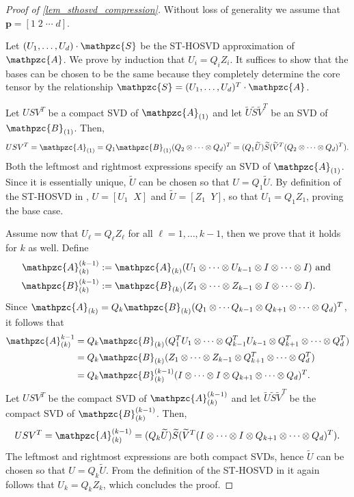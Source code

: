 \documentclass[a4paper,10pt,final]{siamart1116}
\newcommand{\tensor}[1]{\mathpzc{#1}}
\newcommand{\vect}[1]{\mathbf{#1}}
\newcommand{\reflem}[1]{\cref{#1}}
\numberwithin{equation}{section}
\numberwithin{figure}{section}
\numberwithin{table}{section}
\numberwithin{theorem}{section}
\begin{document}
\begin{proof}[Proof of \reflem{lem_sthosvd_compression}]
Without loss of generality we assume that $\vect{p} = [1\; 2\; \cdots\; d]$.

Let $(U_1,\ldots,U_d) \cdot \tensor{S}$ be the ST-HOSVD approximation of $\tensor{A}$. We prove by induction that $U_i = Q_i Z_i$. It suffices to show that the bases can be chosen to be the same because they completely determine the core tensor by the relationship $\tensor{S} = (U_1,\ldots,U_d)^T \cdot \tensor{A}$.

Let $USV^T$ be a compact SVD of $\tensor{A}_{(1)}$ and let $\widetilde{U}\widetilde{S}\widetilde{V}^T$ be an SVD of $\tensor{B}_{(1)}$. Then,
\begin{align*}
 USV^T
 = \tensor{A}_{(1)}
 = Q_1 \tensor{B}_{(1)} (Q_2 \otimes \cdots \otimes Q_d)^T
 = (Q_1 \widetilde{U}) \widetilde{S} (\widetilde{V}^T (Q_2 \otimes \cdots \otimes Q_d)^T).
\end{align*}
Both the leftmost and rightmost expressions specify an SVD of $\tensor{A}_{(1)}$. Since it is es\-sentially unique,  {$\widetilde{U}$ can be chosen} so that $U = Q_1 \widetilde{U}$. By definition of the ST-HOSVD in \cite{VVM2012}, $U = [U_1 \;\; X]$ and $\widetilde{U} = [Z_1 \;\; Y]$, so that $U_1 = Q_1 Z_1$, proving the base case.

Assume now that $U_\ell = Q_\ell Z_\ell$ for all $\ell = 1, \ldots, k-1$, then we prove that it holds for $k$ as well. Define
\begin{align*}
 \tensor{A}_{(k)}^{(k-1)} &:= \tensor{A}_{(k)} (U_1 \otimes \cdots \otimes U_{k-1} \otimes I \otimes \cdots \otimes I) \text{ and }\\
 \tensor{B}_{(k)}^{(k-1)} &:= \tensor{B}_{(k)} (Z_1 \otimes \cdots \otimes Z_{k-1} \otimes I \otimes \cdots \otimes I).
\end{align*}
Since $\tensor{A}_{(k)} = Q_k \tensor{B}_{(k)} (Q_1 \otimes \cdots Q_{k-1} \otimes Q_{k+1} \otimes \cdots \otimes Q_d )^T$, it follows that
\begin{align*}
 \tensor{A}_{(k)}^{k-1}
 &= Q_k \tensor{B}_{(k)} (Q_1^T U_1 \otimes \cdots \otimes Q_{k-1}^T U_{k-1} \otimes Q_{k+1}^T \otimes \cdots \otimes Q_d^T) \\
 &= Q_k \tensor{B}_{(k)} (Z_1 \otimes \cdots \otimes Z_{k-1} \otimes Q_{k+1}^T \otimes \cdots \otimes Q_d^T) \\
 &= Q_k \tensor{B}_{(k)}^{(k-1)} (I\otimes \cdots \otimes I\otimes Q_{k+1} \otimes \cdots \otimes Q_d)^T.
\end{align*}
Let $USV^T$ be the compact SVD of $\tensor{A}_{(k)}^{(k-1)}$ and let $\widetilde{U}\widetilde{S}\widetilde{V}^T$ be the compact SVD of $\tensor{B}_{(k)}^{(k-1)}$. Then,
\[
 USV^T = \tensor{A}_{(k)}^{(k-1)} = (Q_k \widetilde{U}) \widetilde{S} (\widetilde{V}^T (I\otimes \cdots \otimes I\otimes Q_{k+1} \otimes \cdots \otimes Q_d)^T).
\]
The leftmost and rightmost expressions are both compact SVDs, hence $\widetilde{U}$ can be chosen so that $U = Q_k \widetilde{U}$. From the definition of the ST-HOSVD in \cite{VVM2012} it again follows that $U_k = Q_k Z_k$, which concludes the proof.
\end{proof}
\end{document}
